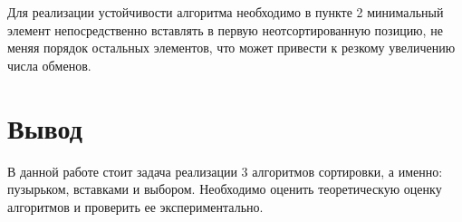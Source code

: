 Для реализации устойчивости алгоритма необходимо в пункте 2 минимальный элемент непосредственно вставлять в первую неотсортированную позицию, не меняя порядок остальных элементов, что может привести к резкому увеличению числа обменов. 

\section*{Вывод}
В данной работе стоит задача реализации 3 алгоритмов сортировки, а именно: пузырьком, вставками и выбором.
Необходимо оценить теоретическую оценку алгоритмов и проверить ее экспериментально.
